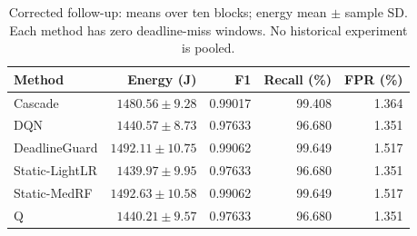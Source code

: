 \begin{table}[t]\centering\small
\caption{Corrected follow-up: means over ten blocks; energy mean $\pm$ sample SD. Each method has zero deadline-miss windows. No historical experiment is pooled.}\label{tab:followup}
\begin{tabular}{lrrrr}\toprule Method & Energy (J) & F1 & Recall (\%) & FPR (\%)\\\midrule
Cascade & $1480.56\pm9.28$ & 0.99017 & 99.408 & 1.364\\
DQN & $1440.57\pm8.73$ & 0.97633 & 96.680 & 1.351\\
DeadlineGuard & $1492.11\pm10.75$ & 0.99062 & 99.649 & 1.517\\
Static-LightLR & $1439.97\pm9.95$ & 0.97633 & 96.680 & 1.351\\
Static-MedRF & $1492.63\pm10.58$ & 0.99062 & 99.649 & 1.517\\
Q & $1440.21\pm9.57$ & 0.97633 & 96.680 & 1.351\\
\bottomrule\end{tabular}\end{table}
